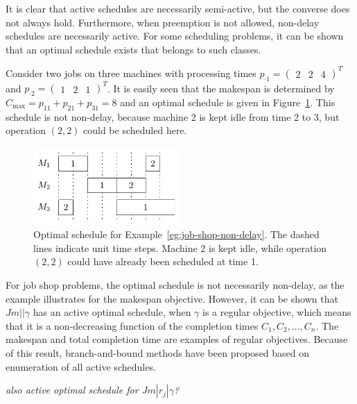 \documentclass{article}
\theoremstyle{definition}
\theoremstyle{plain}
\begin{document}
It is clear that active schedules are necessarily semi-active, but the converse
does not always hold. Furthermore, when preemption is not allowed, non-delay
schedules are necessarily active. For some scheduling problems, it can be shown
that an optimal schedule exists that belongs to such classes.

\begin{eg}
  \label{eg:job-shop-non-delay}
  Consider two jobs on three machines with processing times
  $p_{\cdot 1} = \begin{pmatrix} 2 & 2 & 4 \end{pmatrix}^T$ and
  $p_{\cdot 2} = \begin{pmatrix} 1 & 2 & 1 \end{pmatrix}^T$. It is easily seen
  that the makespan is determined by
  $C_\text{max} = p_{11} + p_{21} + p_{31} = 8$ and an optimal schedule is given
  in Figure~\ref{fig:job-shop-delay}. This schedule is not non-delay, because
  machine 2 is kept idle from time 2 to 3, but operation $(2,2)$ could be
  scheduled here.
\end{eg}

\begin{figure}
  \centering
  \includegraphics[width=0.5\textwidth]{figures/job-shop-delay.pdf}
  \caption{Optimal schedule for Example~\ref{eg:job-shop-non-delay}. The dashed
    lines indicate unit time steps. Machine 2 is kept idle, while operation
    $(2,2)$ could have already been scheduled at time 1.}
  \label{fig:job-shop-delay}
\end{figure}

For job shop problems, the optimal schedule is not necessarily non-delay, as the
example illustrates for the makespan objective. However, it can be
shown that $Jm || \gamma$ has an active optimal schedule, when $\gamma$ is a
regular objective, which means that it is a non-decreasing function of the
completion times $C_1, C_2, \dots, C_n$. The makespan and total completion time
are examples of regular objectives. Because of this result, branch-and-bound
methods have been proposed based on enumeration of all active schedules.

\vspace{0.5em}
\noindent
\textit{\color{blue}also active optimal schedule for $Jm | r_j | \gamma$?}
\end{document}
